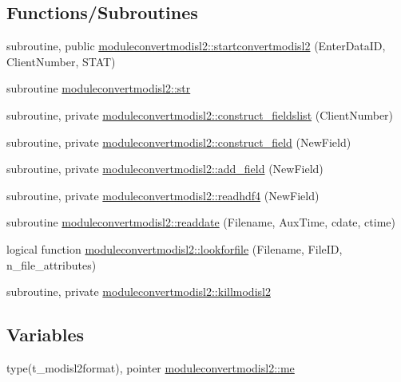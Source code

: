 \subsection*{Functions/\+Subroutines}
\begin{DoxyCompactItemize}
\item 
subroutine, public \mbox{\hyperlink{namespacemoduleconvertmodisl2_aa38d6c70d36fe4b61950bdeaf7f6ff18}{moduleconvertmodisl2\+::startconvertmodisl2}} (Enter\+Data\+ID, Client\+Number, S\+T\+AT)
\item 
subroutine \mbox{\hyperlink{namespacemoduleconvertmodisl2_a1526471e2bde49d7ab2752ae78288ef5}{moduleconvertmodisl2\+::str}}
\item 
subroutine, private \mbox{\hyperlink{namespacemoduleconvertmodisl2_ab79be5b024d52c708202d2716a6467e7}{moduleconvertmodisl2\+::construct\+\_\+fieldslist}} (Client\+Number)
\item 
subroutine, private \mbox{\hyperlink{namespacemoduleconvertmodisl2_a8eaadcf3a3d4a83e399eabd3c0502909}{moduleconvertmodisl2\+::construct\+\_\+field}} (New\+Field)
\item 
subroutine, private \mbox{\hyperlink{namespacemoduleconvertmodisl2_a133fa594d1513ec9b6ed011f318d87e8}{moduleconvertmodisl2\+::add\+\_\+field}} (New\+Field)
\item 
subroutine, private \mbox{\hyperlink{namespacemoduleconvertmodisl2_a816da8e71fe8787069f3e7359fc8445f}{moduleconvertmodisl2\+::readhdf4}} (New\+Field)
\item 
subroutine \mbox{\hyperlink{namespacemoduleconvertmodisl2_a0d7d930d189037284103c8340c2d3cf6}{moduleconvertmodisl2\+::readdate}} (Filename, Aux\+Time, cdate, ctime)
\item 
logical function \mbox{\hyperlink{namespacemoduleconvertmodisl2_a95ba390f4da93899410109801bcd5011}{moduleconvertmodisl2\+::lookforfile}} (Filename, File\+ID, n\+\_\+file\+\_\+attributes)
\item 
subroutine, private \mbox{\hyperlink{namespacemoduleconvertmodisl2_ac166b6c8f2cb482fc76e22739ee0a87d}{moduleconvertmodisl2\+::killmodisl2}}
\end{DoxyCompactItemize}
\subsection*{Variables}
\begin{DoxyCompactItemize}
\item 
type(t\+\_\+modisl2format), pointer \mbox{\hyperlink{namespacemoduleconvertmodisl2_a679fc9516492ddf5d2745fc5ee6aa00f}{moduleconvertmodisl2\+::me}}
\end{DoxyCompactItemize}
